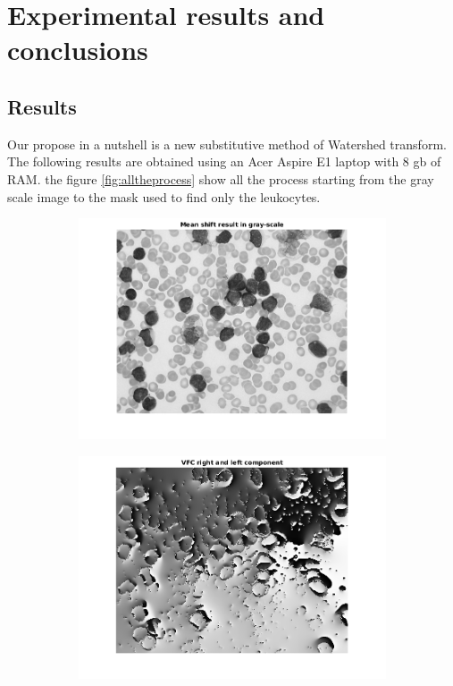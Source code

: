 \chapter{Experimental results and conclusions}
\section{Results}
Our propose in a nutshell is a new substitutive method of Watershed transform. The following results are obtained using an Acer Aspire E1 laptop with 8 gb of RAM. the figure \ref{fig:alltheprocess} show all the process starting from the gray scale image to the mask used to find only the leukocytes.
\begin{figure}[htbp]
    \centering
    \begin{subfigure}[b]{0.45\textwidth}
        \includegraphics[width=\textwidth]{img/final/figure1.png}
        \caption{ }
        \label{fig:fig1}
    \end{subfigure}
    \begin{subfigure}[b]{0.45\textwidth}
        \includegraphics[width=\textwidth]{img/final/figure2.png}

\end{subfigure}
\end{figure}
